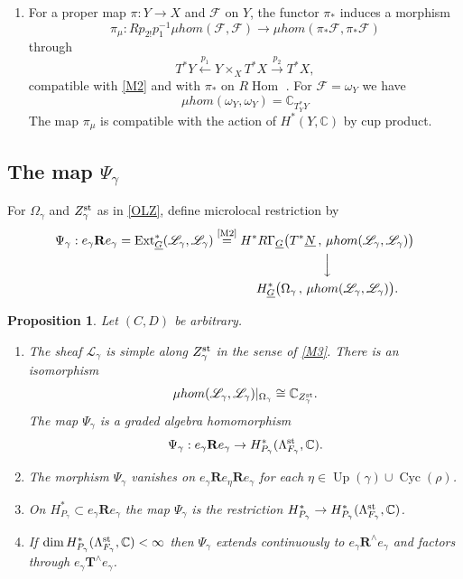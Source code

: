 \documentclass[11pt,reqno]{amsart}
\newtheorem{Proposition}[Theorem]{Proposition}
\theoremstyle{definition}
\theoremstyle{remark}
\def\bbC{\mathbb C}
\def\dN{\underline N}
\def\dG{\underline G}
\def\Hom{\operatorname{Hom}}
\def\Ext{\operatorname{Ext}}
\def\Up{\operatorname{Up}}
\def\Cyc{\operatorname{Cyc}}
\def\muhom{\mu hom}
\def\bR{\mathbf R}
\def\bT{\mathbf T}
\begin{document}
\begin{enumerate}[label=$\mathrm{(M\arabic*)}$,leftmargin=10mm]
\item\label{M4} For a proper map $\pi:Y\to X$ and $\mathcal F$ on $Y$, the functor $\pi_*$ induces a morphism
$$\pi_\mu:Rp_{2!}p_1^{-1}\muhom(\mathcal F,\mathcal F)\to\muhom(\pi_*\mathcal F,\pi_*\mathcal F)$$ 
through 
$$T^*Y\xleftarrow{p_1}Y\times_XT^*X\xrightarrow{p_2}T^*X,$$
compatible with \ref{M2} and with $\pi_*$ on $R\Hom$ \cite[\S4.4, \S5.4]{KS90}. For $\mathcal F=\omega_Y$ we have
$$\muhom(\omega_Y,\omega_Y)=\bbC_{T^*_YY}$$
The map $\pi_\mu$ is compatible with the action of $H^*(Y,\mathbb C)$ by cup product.
\end{enumerate}
\subsection{The map $\Psi_\gamma$}\label{subsec:psi-map}
For $\Omega_\gamma$ and $Z_\gamma^{\rm st}$ as in \eqref{OLZ},
define microlocal restriction by
\begin{equation}\label{PSG}
\begin{split}
\Psi_\gamma: e_\gamma \mathbf{R} e_\gamma =
\Ext^*_{\dG}(\mathscr L_\gamma,\mathscr L_\gamma)
\overset{\text{\ref{M2}}}{=}
\begin{gathered}[t]
H^*R\Gamma_{\dG}\big(T^*\dN\,,\,\muhom(\mathscr L_\gamma,\mathscr L_\gamma)\big)\\
\Big\downarrow\\
H^*_{\dG}\big(\Omega_\gamma\,,\,\muhom(\mathscr L_\gamma,\mathscr L_\gamma)\big).
\end{gathered}
\end{split}
\end{equation}


\begin{Proposition}\label{prop:psi}
Let $(C,D)$ be arbitrary.
\begin{enumerate}[label=$\mathrm{(\alph*)}$,leftmargin=8mm]
\item 
The sheaf $\mathscr L_\gamma$ is simple along $Z^{\rm st}_\gamma$ in the sense of  \ref{M3}.
There is an isomorphism 
$$\muhom(\mathscr L_\gamma,\mathscr L_\gamma)|_{\Omega_\gamma}\cong\bbC_{Z^{\rm st}_\gamma}.$$
The map $\Psi_\gamma$ is a graded algebra homomorphism
$$\Psi_\gamma:
e_\gamma \bR e_\gamma\to H^*_{P_\gamma}(\Lambda^{\rm st}_{F_\gamma},\bbC).$$
\item 
The morphism $\Psi_\gamma$ vanishes on $e_\gamma \bR e_\eta \bR e_\gamma$ for each $\eta\in\Up(\gamma)\cup\Cyc(\rho)$.
\item 
On $H^*_{P_\gamma}\subset e_\gamma \bR e_\gamma$ the map $\Psi_\gamma$ is the restriction $H^*_{P_\gamma}\to H^*_{P_\gamma}(\Lambda^{\rm st}_{F_\gamma},\bbC)$.
\item If $\dim H^*_{P_\gamma}(\Lambda^{\rm st}_{F_\gamma},\bbC)<\infty$  then $\Psi_\gamma$ extends continuously to $e_\gamma \bR^\wedge e_\gamma$ and factors through
$e_\gamma \bT^\wedge e_\gamma$.
\end{enumerate}
\end{Proposition}
\end{document}
